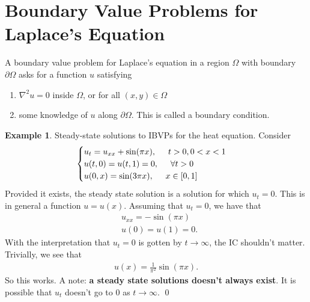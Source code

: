 \documentclass{book}
\theoremstyle{definition}
\newtheorem{exmp}{Example}[section]
\newcommand{\p}{\partial}
\newcommand{\f}[2]{\frac{#1}{#2}}
\begin{document}
\section{Boundary Value Problems for Laplace's Equation}

A boundary value problem for Laplace's equation in a region $\Omega$ with boundary $\p \Omega$ asks for a function $u$ satisfying
\begin{enumerate}
	\item $\nabla^2 u = 0 $ inside $\Omega$, or for all $(x,y)\in \Omega$
	\item some knowledge of $u$ along $\p \Omega$. This is called a boundary condition.
\end{enumerate}

	
	\begin{exmp}
		Steady-state solutions to IBVPs for the heat equation. Consider
		\begin{align*}
		\begin{cases}
		u_t = u_{xx} + \sin(\pi x), \hspace{0.5cm} t>0, 0<x<1\\
		u(t,0) = u(t,1) = 0,\hspace{0.5cm} \forall t >0\\
		u(0,x) = \sin(3\pi x),\hspace{0.5cm} x\in [0,1]
		\end{cases}
		\end{align*}
		Provided it exists, the steady state solution is a solution for which $u_t = 0$. This is in general a function $u = u(x)$. Assuming that $u_t = 0$, we have that
		\begin{align*}
		&u_{xx} = -\sin(\pi x)\\
		&u(0) = u(1) = 0.
		\end{align*}
		With the interpretation that $u_t = 0$ is gotten by $t\to \infty$, the IC shouldn't matter. Trivially, we see that 
		\begin{align*}
		u(x) = \f{1}{\pi^2}\sin(\pi x).
		\end{align*}
		So this works. A note: \textbf{a steady state solutions doesn't always exist}. It is possible that $u_t$ doesn't go to 0 as $t\to \infty$. 
		\qed
	\end{exmp}
\end{document}
